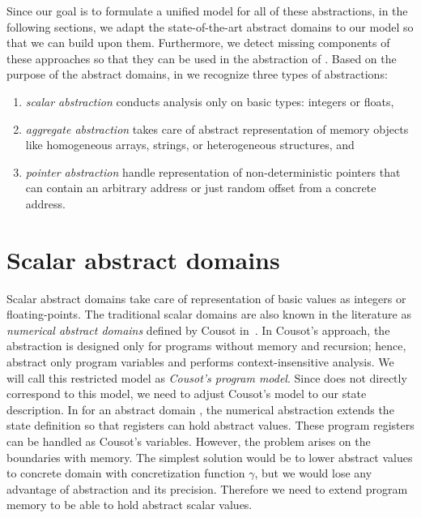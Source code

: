 Since our goal is to formulate a unified model for all of these abstractions,
in the following sections, we adapt the state-of-the-art abstract
domains to our \llvm model so that we can build upon them. Furthermore, we
detect missing components of these approaches so that they can be used in the
abstraction of \llvm. Based on the purpose of the abstract domains, in \llvm we
recognize three types of abstractions:
\begin{enumerate}
    \item \emph{scalar abstraction} conducts analysis only on basic types:
        integers or floats,
    \item \emph{aggregate abstraction} takes care of abstract representation of
        memory objects like homogeneous arrays, strings, or heterogeneous
        structures, and
    \item \emph{pointer abstraction} handle representation of non-deterministic
        pointers that can contain an arbitrary address or just random offset
        from a concrete address.
\end{enumerate}

\section{Scalar abstract domains}
\label{sec:domains}

Scalar abstract domains take care of representation of basic \llvm values as
integers or floating-points. The traditional scalar domains are also known in
the literature as \emph{numerical abstract domains} defined by Cousot
in~\cite{Cousot1977}. In Cousot's approach, the abstraction is designed only
for programs without memory and recursion; hence, abstract only program
variables and performs context-insensitive analysis. We will call this
restricted model as \emph{Cousot's program model}. Since \llvm does not
directly correspond to this model, we need to adjust Cousot's model to our
state description. In \llvm for an abstract domain \domain{}, the numerical
abstraction extends the state definition so that registers can hold abstract
values. These program registers can be handled as Cousot's variables. However,
the problem arises on the boundaries with memory.  The simplest solution would
be to lower abstract values to concrete domain with concretization function
$\gamma$, but we would lose any advantage of abstraction and its
precision.  Therefore we need to extend \llvm program memory to be able to hold
abstract scalar values.

